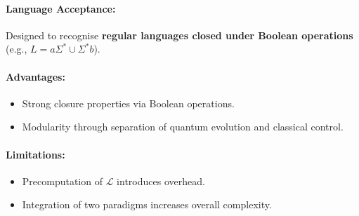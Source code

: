 \paragraph{Language Acceptance:}  
Designed to recognise \textbf{regular languages closed under Boolean operations} (e.g., \( L = a\Sigma^* \cup \Sigma^* b \)).

\paragraph{Advantages:}
\begin{itemize}
    \item Strong closure properties via Boolean operations.
    \item Modularity through separation of quantum evolution and classical control.
\end{itemize}

\paragraph{Limitations:}
\begin{itemize}
    \item Precomputation of \( \mathcal{L} \) introduces overhead.
    \item Integration of two paradigms increases overall complexity.
\end{itemize}



